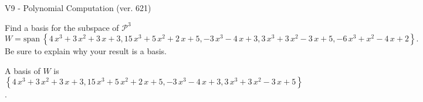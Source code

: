 \begin{exercise}
  \begin{exerciseTitle}V9 - Polynomial Computation (ver. 621)\end{exerciseTitle}
  \begin{exerciseStatement}
    Find a basis for the subspace of \(\mathcal{P}^3\) 
\[W=\mathrm{span}\ \left\{4 \, x^{3} + 3 \, x^{2} + 3 \, x + 3 , 15 \, x^{3} + 5 \, x^{2} + 2 \, x + 5 , -3 \, x^{3} - 4 \, x + 3 , 3 \, x^{3} + 3 \, x^{2} - 3 \, x + 5 , -6 \, x^{3} + x^{2} - 4 \, x + 2\right\}.\]
 Be sure to explain why your result is a basis.


  \end{exerciseStatement}
  \begin{exerciseAnswer}
   A basis of \(W\) is  \(\left\{4 \, x^{3} + 3 \, x^{2} + 3 \, x + 3 , 15 \, x^{3} + 5 \, x^{2} + 2 \, x + 5 , -3 \, x^{3} - 4 \, x + 3 , 3 \, x^{3} + 3 \, x^{2} - 3 \, x + 5\right\}\).
  


  \end{exerciseAnswer}
\end{exercise}